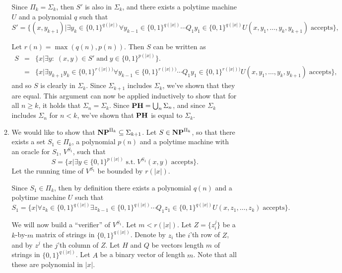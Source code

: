 \documentclass[11pt]{article} \usepackage{amssymb}
\begin{document}
\begin{enumerate}
\begin{enumerate}
      Since $\Pi_k=\Sigma_k$, then $S'$ is also in $\Sigma_k$, and there exists a polytime machine
      $U$ and a polynomial $q$ such that 
      \begin{equation*}
        S'=\{(x,y_{k+1})|\exists y_k\in\{0,1\}^{q(|x|)}\forall y_{k-1}\in\{0,1\}^{q(|x|)}\cdots Q_1y_1\in\{0,1\}^{q(|x|)}U(x,y_1,\ldots,y_k,y_{k+1}) \;\mbox{accepts}\},
      \end{equation*}
      
      Let $r(n)=\max(q(n),p(n))$. Then $S$ can be written as 
      \begin{eqnarray*}
        S  &=&\{x|\exists y:\; (x,y)\in S'\;\mbox{and}\;y\in\{0,1\}^{p(|x|)}\}.
        \\ &=&\{x|\exists y_{k+1}y_k\in\{0,1\}^{r(|x|))}\forall y_{k-1}\in\{0,1\}^{r(|x|))}\cdots Q_1y_1\in\{0,1\}^{r(|x|))}U(x,y_1,\ldots,y_k,y_{k+1}) \;\mbox{accepts}\},
      \end{eqnarray*}
      and so $S$ is clearly in $\Sigma_k$. Since $\Sigma_{k+1}$ includes
      $\Sigma_k$, we've shown that they are equal.
      This argument can now be applied
      inductively to show that for all $n\geq k$, it holds that 
      $\Sigma_n=\Sigma_k$. Since ${\bf PH}=\bigcup_n\Sigma_n$, and since $\Sigma_k$ includes $\Sigma_n$ for
      $n<k$, we've shown that
      ${\bf PH}$ is equal to $\Sigma_k$.

      \item
        We would like to show that ${\bf NP}^{\Pi_k}\subseteq \Sigma_{k+1}$. 
        Let $S\in {\bf NP}^{\Pi_k}$, so that there exists a set $S_1\in\Pi_k$, a
        polynomial $p(n)$ and
        a polytime machine with an oracle for $S_1$, $V^{S_1}$, such that
        \begin{equation*}
          S=\{x|\exists y\in\{0,1\}^{p(|x|)}\;\mbox{s.t.}\;V^{S_1}(x,y) \;\mbox{accepts}\}.
        \end{equation*}
        Let the running time of $V^{S_1}$ be bounded by $r(|x|)$.


        Since $S_1\in\Pi_k$, then by definition there exists a polynomial 
        $q(n)$ and a polytime machine $U$ such that
        \begin{equation*}
          S_1=\{x|\forall z_k\in\{0,1\}^{q(|x|)}\exists z_{k-1}\in\{0,1\}^{q(|x|)}\cdots Q_1z_1\in\{0,1\}^{q(|x|)}U(x,z_1,\ldots,z_k) \;\mbox{accepts}\}.
        \end{equation*}

        
        We will now build a ``verifier'' of $V^{S_1}$. Let $m < r(|x|)$.
        Let $Z=\{z_i^j\}$ be a $k$-by-$m$ matrix of strings in 
        $\{0,1\}^{q(|x|)}$. Denote
        by $z_i$ the $i$'th row of $Z$, and by $z^j$ the $j$'th column of $Z$.
        Let $H$ and $Q$ be vectors length $m$ of strings in $\{0,1\}^{q(|x|)}$. Let $A$ be 
        a binary vector of length $m$. Note that all these are polynomial
        in $|x|$.


\end{enumerate}
\end{enumerate}
\end{document}
